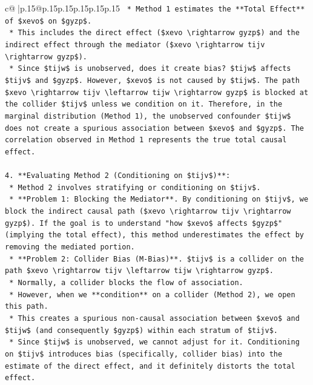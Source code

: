 \documentclass{article}
\begin{document}
{\begin{supertabular}{c@{$\;$}|p{.15\linewidth}@{}p{.15\linewidth}p{.15\linewidth}p{.15\linewidth}p{.15\linewidth}p{.15\linewidth}}
{{{\texttt{    *   Method 1 estimates the **Total Effect** of \$xevo\$ on \$gyzp\$.} \\
\texttt{    *   This includes the direct effect (\$xevo \textbackslash{}rightarrow gyzp\$) and the indirect effect through the mediator (\$xevo \textbackslash{}rightarrow tijv \textbackslash{}rightarrow gyzp\$).} \\
\texttt{    *   Since \$tijw\$ is unobserved, does it create bias? \$tijw\$ affects \$tijv\$ and \$gyzp\$. However, \$xevo\$ is not caused by \$tijw\$. The path \$xevo \textbackslash{}rightarrow tijv \textbackslash{}leftarrow tijw \textbackslash{}rightarrow gyzp\$ is blocked at the collider \$tijv\$ unless we condition on it. Therefore, in the marginal distribution (Method 1), the unobserved confounder \$tijw\$ does not create a spurious association between \$xevo\$ and \$gyzp\$. The correlation observed in Method 1 represents the true total causal effect.} \\
\\ 
\texttt{4.  **Evaluating Method 2 (Conditioning on \$tijv\$)**:} \\
\texttt{    *   Method 2 involves stratifying or conditioning on \$tijv\$.} \\
\texttt{    *   **Problem 1: Blocking the Mediator**. By conditioning on \$tijv\$, we block the indirect causal path (\$xevo \textbackslash{}rightarrow tijv \textbackslash{}rightarrow gyzp\$). If the goal is to understand "how \$xevo\$ affects \$gyzp\$" (implying the total effect), this method underestimates the effect by removing the mediated portion.} \\
\texttt{    *   **Problem 2: Collider Bias (M{-}Bias)**. \$tijv\$ is a collider on the path \$xevo \textbackslash{}rightarrow tijv \textbackslash{}leftarrow tijw \textbackslash{}rightarrow gyzp\$.} \\
\texttt{        *   Normally, a collider blocks the flow of association.} \\
\texttt{        *   However, when we **condition** on a collider (Method 2), we open this path.} \\
\texttt{        *   This creates a spurious non{-}causal association between \$xevo\$ and \$tijw\$ (and consequently \$gyzp\$) within each stratum of \$tijv\$.} \\
\texttt{        *   Since \$tijw\$ is unobserved, we cannot adjust for it. Conditioning on \$tijv\$ introduces bias (specifically, collider bias) into the estimate of the direct effect, and it definitely distorts the total effect.} \\
}}}
\end{supertabular}}
\end{document}
